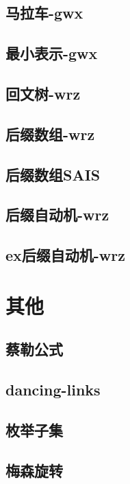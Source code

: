 \documentclass[titlepage,a4paper,10pt]{article}
\begin{document}
\begin{spacing}{0.8}
			\subsection{马拉车-gwx}
				
			\subsection{最小表示-gwx}
				
			\subsection{回文树-wrz}
				
			\subsection{后缀数组-wrz}
				
			\subsection{后缀数组SAIS}
				
			\subsection{后缀自动机-wrz}
				
			\subsection{ex后缀自动机-wrz}
				
		\section{其他}
			\subsection{蔡勒公式}
				
			\subsection{dancing-links}
				
			\subsection{枚举子集}
				
			\subsection{梅森旋转}
				

\end{spacing}
\end{document}
